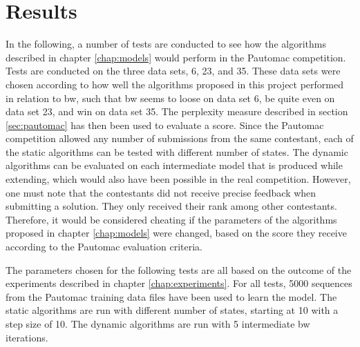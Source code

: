 \chapter{Results}
In the following, a number of tests are conducted to see how the algorithms described in chapter \ref{chap:models} would perform in the Pautomac competition. Tests are conducted on the three data sets, 6, 23, and 35. These data sets were chosen according to how well the algorithms proposed in this project performed in relation to \gls{bw}, such that \gls{bw} seems to loose on data set 6, be quite even on data set 23, and win on data set 35.
The perplexity measure described in section \ref{sec:pautomac} has then been used to evaluate a score.
Since the Pautomac competition allowed any number of submissions from the same contestant, each of the static algorithms can be tested with different number of states. The dynamic algorithms can be evaluated on each intermediate model that is produced while extending, which would also have been possible in the real competition.
However, one must note that the contestants did not receive precise feedback when submitting a solution. They only received their rank among other contestants. Therefore, it would be considered cheating if the parameters of the algorithms proposed in chapter \ref{chap:models} were changed, based on the score they receive according to the Pautomac evaluation criteria.

The parameters chosen for the following tests are all based on the outcome of the experiments described in chapter \ref{chap:experiments}.
For all tests, 5000 sequences from the Pautomac training data files have been used to learn the model. The static algorithms are run with different number of states, starting at 10 with a step size of 10.
The dynamic algorithms are run with 5 intermediate \gls{bw} iterations.   